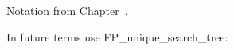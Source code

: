 \documentclass[handout]{mcs}
\begin{document}

\begin{staffnotes}
Notation from
Chapter~.{}
\end{staffnotes}



%




\begin{staffnotes}
In future terms use FP\_unique\_search\_tree:

\end{staffnotes}








\end{document}

